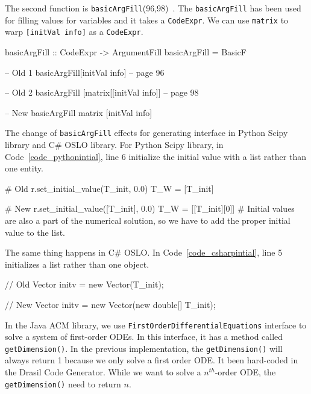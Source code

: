The second function is \verb|basicArgFill|(96,98)~\citep{brooks}. The \verb|basicArgFill| has been used for filling values for variables and it takes a \verb|CodeExpr|. We can use \verb|matrix| to warp \verb|[initVal info]| as a \verb|CodeExpr|.

\begin{listing}[ht]
\begin{haskell1}
basicArgFill :: CodeExpr -> ArgumentFill
basicArgFill = BasicF
\end{haskell1}
\end{listing}

\begin{listing}[ht]
\begin{haskell1}
-- Old 1
basicArgFill[initVal info] -- page 96

-- Old 2
basicArgFill [matrix[[initVal info]] -- page 98

-- New 
basicArgFill matrix [initVal info]
\end{haskell1}
\end{listing}
The change of \verb|basicArgFill| effects for generating interface in Python Scipy library and C\# OSLO library. For Python Scipy library, in Code~\ref{code_pythonintial}, line 6 initialize the initial value with a list rather than one entity.

\begin{listing}
\begin{python1}
# Old 
  r.set_initial_value(T_init, 0.0)
  T_W = [T_init]

# New 
  r.set_initial_value([T_init], 0.0)
  T_W = [[T_init][0]] # Initial values are also a part of the numerical solution, so we have to add the proper initial value to the list.
\end{python1}
\label{code_pythonintial}
\end{listing}
The same thing happens in C\# OSLO. In Code~\ref{code_csharpintial}, line 5 initializes a list rather than one object.  
\begin{listing}[ht]
\begin{csharp1}
// Old 
Vector initv = new Vector(T_init);

// New 
Vector initv = new Vector(new double[] {T_init});
\end{csharp1}
\label{code_csharpintial}
\end{listing}

In the Java ACM library, we use \verb|FirstOrderDifferentialEquations| interface to solve a system of first-order ODEs. In this interface, it has a method called \verb|getDimension()|. In the previous implementation, the \verb|getDimension()| will always return 1 because we only solve a first order ODE. It been hard-coded in the Drasil Code Generator. While we want to solve a $n^{th}$-order ODE, the \verb|getDimension()| need to return $n$.

